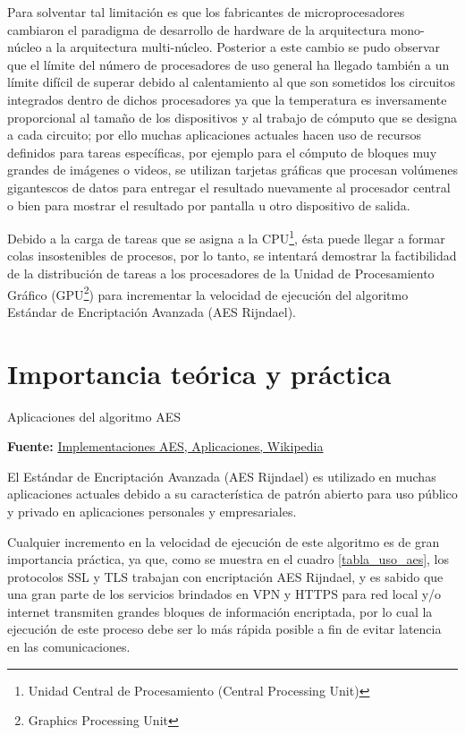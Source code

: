 \documentclass[../main/main.tex]{subfiles}
\begin{document}
  Para solventar tal limitación es que los fabricantes de microprocesadores cambiaron el paradigma de desarrollo de hardware de la arquitectura mono-núcleo a la arquitectura multi-núcleo. Posterior a este cambio se pudo observar que el límite del número de procesadores de uso general ha llegado también a un límite difícil de superar debido al calentamiento al que son sometidos los circuitos integrados dentro de dichos procesadores ya que la temperatura es inversamente proporcional al tamaño de los dispositivos y al trabajo de cómputo que se designa a cada circuito; por ello muchas aplicaciones actuales hacen uso de recursos definidos para tareas específicas, por ejemplo para el cómputo de bloques muy grandes de imágenes o videos, se utilizan tarjetas gráficas que procesan volúmenes gigantescos de datos para entregar el resultado nuevamente al procesador central o bien para mostrar el resultado por pantalla u otro dispositivo de salida.

  Debido a la carga de tareas que se asigna a la CPU\footnote{Unidad Central de Procesamiento (Central Processing Unit)}, ésta puede llegar a formar colas insostenibles de procesos, por lo tanto, se intentará demostrar la factibilidad de la distribución de tareas a los procesadores de la Unidad de Procesamiento Gráfico (GPU\footnote{Graphics Processing Unit}) para incrementar la velocidad de ejecución del algoritmo Estándar de Encriptación Avanzada (AES Rijndael).

  \section{Importancia teórica y práctica}

  \begin{table}
    \centering
    \caption{Aplicaciones del algoritmo AES}
    
    \caption*{\textbf{Fuente:} \href{https://en.wikipedia.org/wiki/AES_implementations}{Implementaciones AES, Aplicaciones, Wikipedia}}
    \label{tabla_uso_aes}
  \end{table}

  El Estándar de Encriptación Avanzada (AES Rijndael) es utilizado en muchas aplicaciones actuales debido a su característica de patrón abierto para uso público y privado en aplicaciones personales y empresariales.

  Cualquier incremento en la velocidad de ejecución de este algoritmo es de gran importancia práctica, ya que, como se muestra en el cuadro \ref{tabla_uso_aes}, los protocolos SSL y TLS trabajan con encriptación AES Rijndael, y es sabido que una gran parte de los servicios brindados en VPN y HTTPS para red local y/o internet transmiten grandes bloques de información encriptada, por lo cual la ejecución de este proceso debe ser lo más rápida posible a fin de evitar latencia en las comunicaciones.
\end{document}
